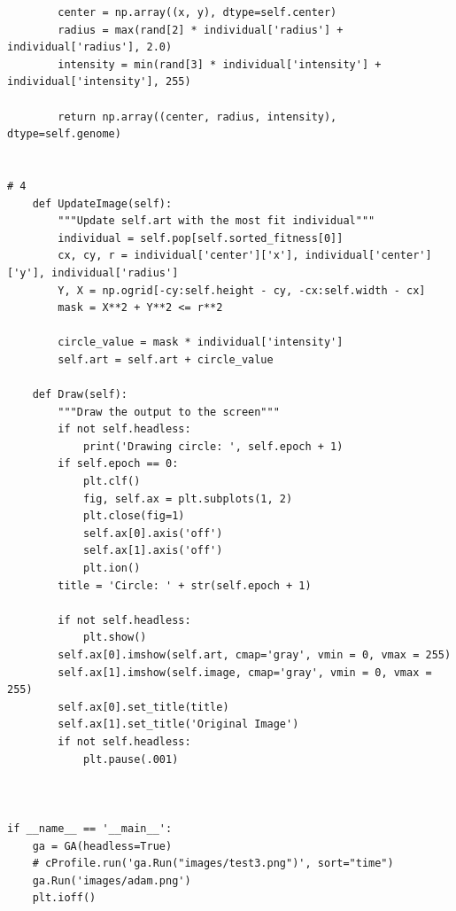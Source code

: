 \documentclass[12pt]{article}
\begin{document}
\begin{verbatim}
        center = np.array((x, y), dtype=self.center)
        radius = max(rand[2] * individual['radius'] + individual['radius'], 2.0)
        intensity = min(rand[3] * individual['intensity'] + individual['intensity'], 255)
        
        return np.array((center, radius, intensity), dtype=self.genome)


# 4 
    def UpdateImage(self):
        """Update self.art with the most fit individual"""
        individual = self.pop[self.sorted_fitness[0]]
        cx, cy, r = individual['center']['x'], individual['center']['y'], individual['radius']
        Y, X = np.ogrid[-cy:self.height - cy, -cx:self.width - cx]
        mask = X**2 + Y**2 <= r**2

        circle_value = mask * individual['intensity']
        self.art = self.art + circle_value

    def Draw(self):
        """Draw the output to the screen"""
        if not self.headless:
            print('Drawing circle: ', self.epoch + 1)
        if self.epoch == 0:
            plt.clf()
            fig, self.ax = plt.subplots(1, 2)
            plt.close(fig=1)
            self.ax[0].axis('off')
            self.ax[1].axis('off')
            plt.ion()
        title = 'Circle: ' + str(self.epoch + 1)

        if not self.headless:
            plt.show()
        self.ax[0].imshow(self.art, cmap='gray', vmin = 0, vmax = 255)
        self.ax[1].imshow(self.image, cmap='gray', vmin = 0, vmax = 255)
        self.ax[0].set_title(title)
        self.ax[1].set_title('Original Image')
        if not self.headless:
            plt.pause(.001)



if __name__ == '__main__':
    ga = GA(headless=True)
    # cProfile.run('ga.Run("images/test3.png")', sort="time")
    ga.Run('images/adam.png')
    plt.ioff()


\end{verbatim}
\end{document}
